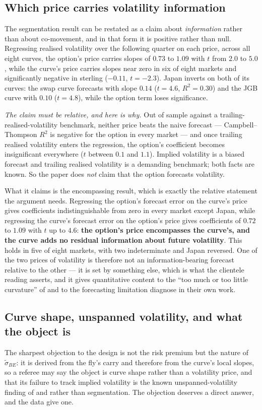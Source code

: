 \documentclass[11pt]{article}
\begin{document}
\subsection{Which price carries volatility information}\label{sec:mz}
The segmentation result can be restated as a claim about \emph{information} rather than about
co-movement, and in that form it is positive rather than null. Regressing realised volatility over the
following quarter on each price, across all eight curves, the option's price carries slopes of
$0.73$ to $1.09$ with $t$ from $2.0$ to $5.0$, while the curve's price carries slopes near zero in six
of eight markets and significantly negative in sterling ($-0.11$, $t=-2.3$). Japan inverts on both of
its curves: the swap curve forecasts with slope $0.14$ ($t=4.6$, $R^2=0.30$) and the JGB curve with
$0.10$ ($t=4.8$), while the option term loses significance.

\emph{The claim must be relative, and here is why.} Out of sample against a trailing-realised-volatility
benchmark, neither price beats the naive forecast --- Campbell--Thompson $R^2$ is negative for the
option in every market --- and once trailing realised volatility enters the regression, the option's
coefficient becomes insignificant everywhere ($t$ between $0.1$ and $1.1$). Implied volatility is a
biased forecast and trailing realised volatility is a demanding benchmark; both facts are known. So
the paper does \emph{not} claim that the option forecasts volatility.

What it claims is the encompassing result, which is exactly the relative statement the argument needs.
Regressing the option's forecast error on the curve's price gives coefficients indistinguishable from
zero in every market except Japan, while regressing the curve's forecast error on the option's price
gives coefficients of $0.72$ to $1.09$ with $t$ up to $4.6$: \textbf{the option's price encompasses the
curve's, and the curve adds no residual information about future volatility}. This holds in five of
eight markets, with two indeterminate and Japan reversed. One of the two prices of volatility is
therefore not an information-bearing forecast relative to the other --- it is set by something else,
which is what the clientele reading asserts, and it gives quantitative content to the ``too much or too
little curvature'' of \citet{rr2021} and to the forecasting limitation \citet{rp2018} diagnose in their
own work.

\subsection{Curve shape, unspanned volatility, and what the object is}\label{sec:spanning}
The sharpest objection to the design is not the risk premium but the nature of $\tilde\sigma_{BE}$: it
is derived from the fly's carry and therefore from the curve's local slopes, so a referee may say the
object is curve shape rather than a volatility price, and that its failure to track implied volatility
is the known unspanned-volatility finding of \citet{cdg2002} and \citet{ab2010} rather than
segmentation. The objection deserves a direct answer, and the data give one.
\end{document}
